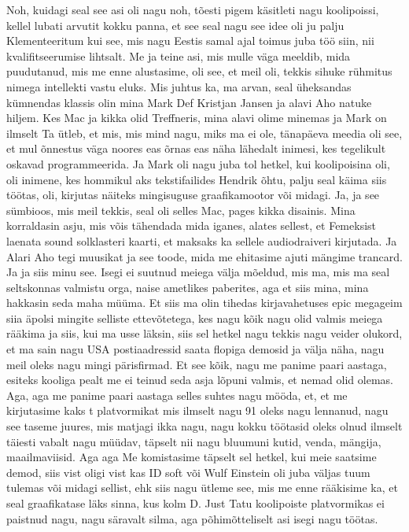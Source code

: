 Noh, kuidagi seal see asi oli nagu noh, tõesti pigem käsitleti nagu koolipoissi, kellel lubati arvutit kokku panna, et see seal nagu see idee oli ju palju Klementeeritum kui see, mis nagu Eestis samal ajal toimus juba töö siin, nii kvalifitseerumise lihtsalt. Me ja teine asi, mis mulle väga meeldib, mida puudutanud, mis me enne alustasime, oli see, et meil oli, tekkis sihuke rühmitus nimega intellekti vastu eluks. Mis juhtus ka, ma arvan, seal üheksandas kümnendas klassis olin mina Mark Def Kristjan Jansen ja alavi Aho natuke hiljem. Kes Mac ja kikka olid Treffneris, mina alavi olime minemas ja Mark on ilmselt Ta ütleb, et mis, mis mind nagu, miks ma ei ole, tänapäeva meedia oli see, et mul õnnestus väga noores eas õrnas eas näha lähedalt inimesi, kes tegelikult oskavad programmeerida. Ja Mark oli nagu juba tol hetkel, kui koolipoisina oli, oli inimene, kes hommikul aks tekstifailides Hendrik õhtu, palju seal käima siis töötas, oli, kirjutas näiteks mingisuguse graafikamootor või midagi. Ja, ja see sümbioos, mis meil tekkis, seal oli selles Mac, pages kikka disainis. Mina korraldasin asju, mis võis tähendada mida iganes, alates sellest, et Femeksist laenata sound solklasteri kaarti, et maksaks ka sellele audiodraiveri kirjutada. Ja Alari Aho tegi muusikat ja see toode, mida me ehitasime ajuti mängime trancard.
Ja ja siis minu see.
Isegi ei suutnud meiega välja mõeldud, mis ma, mis ma seal seltskonnas valmistu orga, naise ametlikes paberites, aga et siis mina, mina hakkasin seda maha müüma. Et siis ma olin tihedas kirjavahetuses epic megageim siia äpolsi mingite selliste ettevõtetega, kes nagu kõik nagu olid valmis meiega rääkima ja siis, kui ma usse läksin, siis sel hetkel nagu tekkis nagu veider olukord, et ma sain nagu USA postiaadressid saata flopiga demosid ja välja näha, nagu meil oleks nagu mingi pärisfirmad. Et see kõik, nagu me panime paari aastaga, esiteks kooliga pealt me ei teinud seda asja lõpuni valmis, et nemad olid olemas. Aga, aga me panime paari aastaga selles suhtes nagu mööda, et, et me kirjutasime kaks t platvormikat mis ilmselt nagu 91 oleks nagu lennanud, nagu see taseme juures, mis matjagi ikka nagu, nagu kokku töötasid oleks olnud ilmselt täiesti vabalt nagu müüdav, täpselt nii nagu bluumuni kutid, venda, mängija, maailmaviisid. Aga aga Me komistasime täpselt sel hetkel, kui meie saatsime demod, siis vist oligi vist kas ID soft või Wulf Einstein oli juba väljas tuum tulemas või midagi sellist, ehk siis nagu ütleme see, mis me enne rääkisime ka, et seal graafikatase läks sinna, kus kolm D. Just Tatu koolipoiste platvormikas ei paistnud nagu, nagu säravalt silma, aga põhimõtteliselt asi isegi nagu töötas.
